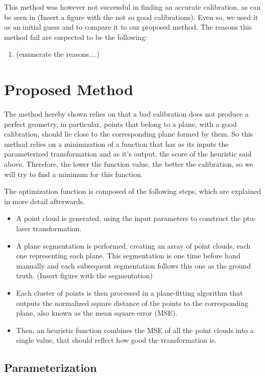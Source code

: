 This method was however not successful in finding an accurate calibration, as can be seen in (Insert a figure with the not so good calibrations). Even so, we used it as an initial guess and to compare it to our proposed method. The reasons this method fail are suspected to be the following:

\begin{enumerate}
    \item (enumerate the reasons....)
\end{enumerate}

\section{Proposed Method}

The method hereby shown relies on that a bad calibration does not produce a perfect geometry, in particular, points that belong to a plane, with a good calibration, should lie close to the corresponding plane formed by them. So this method relies on a minimization of a function that has as its inputs the parameterized transformation and as it's output, the score of the heuristic said above. Therefore, the lower the function value, the better the calibration, so we will try to find a minimum for this function.

The optimization function is composed of the following steps, which are explained in more detail afterwards.

\begin{itemize}
    \item A point cloud is generated, using the input parameters to construct the ptu-laser transformation.
    \item A plane segmentation is performed, creating an array of point clouds, each one representing each plane. This segmentation is one time before hand manually and each subsequent segmentation follows this one as the ground truth. (Insert figure with the segmentation)
    \item Each cluster of points is then processed in a plane-fitting algorithm that outputs the normalized square distance of the points to the corresponding plane, also known as the mean square error (MSE).
    \item Then, an heuristic function combines the MSE of all the point clouds into a single value, that should reflect how good the transformation is.
\end{itemize}

\subsection{Parameterization}

